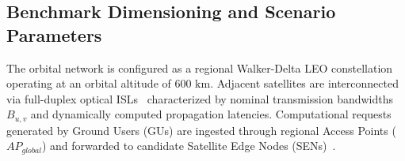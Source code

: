 \subsection{Benchmark Dimensioning and Scenario Parameters}
\label{subsec:bench_parameters}

The orbital network is configured as a regional Walker-Delta LEO constellation~\cite{walker1984satellite} operating at an orbital altitude of $600\text{ km}$. Adjacent satellites are interconnected via full-duplex optical ISLs~\cite{chen2021isl, chaudhry2021laser} characterized by nominal transmission bandwidths $B_{u,v}$ and dynamically computed propagation latencies. Computational requests generated by Ground Users (GUs) are ingested through regional Access Points ($AP_{global}$) and forwarded to candidate Satellite Edge Nodes (SENs)~\cite{leyva2023satellite, icdcs_satellite_2025}.

